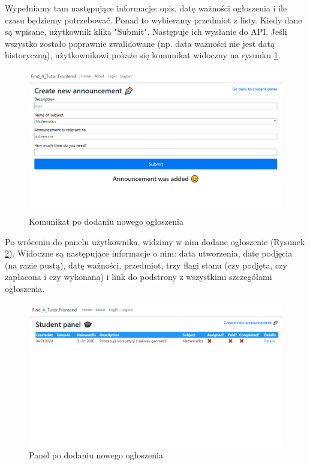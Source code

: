 \documentclass[12pt]{article}
\numberwithin{figure}{section}
\begin{document}
\begin{sloppypar}
Wypełniamy tam następujące informacje: opis, datę ważności ogłoszenia i ile czasu będziemy potrzebować. Ponad to wybieramy przedmiot z listy. Kiedy dane są wpisane, użytkownik klika "Submit". Następuje ich wysłanie do API. Jeśli wszystko zostało poprawnie zwalidowane (np. data ważności nie jest datą historyczną), użytkownikowi pokaże się komunikat widoczny na rysunku \ref{fig:added}.
\begin{figure}[H] 
    \centering
    \includegraphics[width=1\textwidth]{images/chapter_4/added.png}
    \caption{Komunikat po dodaniu nowego ogłoszenia}
    \label{fig:added}
\end{figure}

Po wróceniu do panelu użytkownika, widzimy w nim dodane ogłoszenie (Rysunek \ref{fig:student}).
Widoczne są następujące informacje o nim: data utworzenia, datę podjęcia (na razie pustą), datę ważności, przedmiot, trzy flagi stanu (czy podjęta, czy zapłacona i czy wykonana) i link do podstrony z wszystkimi szczegółami ogłoszenia.
\begin{figure}[H] 
    \centering
    \includegraphics[width=1\textwidth]{images/chapter_4/student.png}
    \caption{Panel po dodaniu nowego ogłoszenia}
    \label{fig:student}
\end{figure}


\end{sloppypar}
\end{document}
